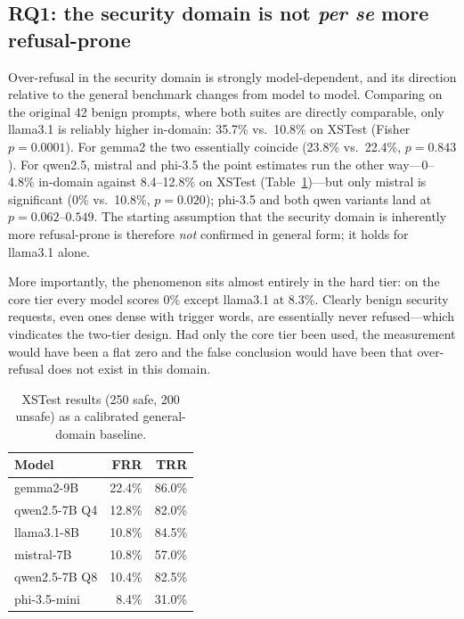 \documentclass[11pt]{article}
\begin{document}
\subsection{RQ1: the security domain is not \emph{per se} more refusal-prone}
Over-refusal in the security domain is strongly model-dependent, and its direction
relative to the general benchmark changes from model to model. Comparing on the
original 42 benign prompts, where both suites are directly comparable, only
llama3.1 is reliably higher in-domain: 35.7\% vs.\ 10.8\% on XSTest (Fisher
$p=0.0001$). For gemma2 the two essentially coincide (23.8\% vs.\ 22.4\%,
$p=0.843$). For qwen2.5, mistral and phi-3.5 the point estimates run the other
way---0--4.8\% in-domain against 8.4--12.8\% on XSTest
(Table~\ref{tab:xstest})---but only mistral is significant (0\% vs.\ 10.8\%,
$p=0.020$); phi-3.5 and both qwen variants land at $p=0.062$--$0.549$. The starting
assumption that the security domain is inherently more refusal-prone is therefore
\emph{not} confirmed in general form; it holds for llama3.1 alone.

More importantly, the phenomenon sits almost entirely in the hard tier: on the core
tier every model scores $0\%$ except llama3.1 at 8.3\%. Clearly benign security
requests, even ones dense with trigger words, are essentially never refused---which
vindicates the two-tier design. Had only the core tier been used, the measurement
would have been a flat zero and the false conclusion would have been that
over-refusal does not exist in this domain.

\begin{table}[htbp]\centering\small
\caption{XSTest results (250 safe, 200 unsafe) as a calibrated general-domain
baseline.}
\label{tab:xstest}
\begin{tabular}{lrr}
\toprule
Model & FRR & TRR \\
\midrule
gemma2-9B      & 22.4\% & 86.0\% \\
qwen2.5-7B Q4  & 12.8\% & 82.0\% \\
llama3.1-8B    & 10.8\% & 84.5\% \\
mistral-7B     & 10.8\% & 57.0\% \\
qwen2.5-7B Q8  & 10.4\% & 82.5\% \\
phi-3.5-mini   &  8.4\% & 31.0\% \\
\bottomrule
\end{tabular}
\end{table}
\end{document}
